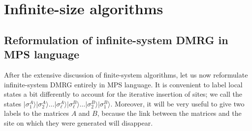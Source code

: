 \documentclass[a4paper,10pt,oneside,onecolumn,1p,times]{elsarticle}
\newcommand{\ket}[1]{\mbox{$| #1  \rangle$}}
\begin{document}
\section{Infinite-size algorithms}
\label{sec:infinite}

\subsection{Reformulation of infinite-system DMRG in MPS language}

After the extensive discussion of finite-system algorithms, let us now reformulate infinite-system DMRG entirely in MPS language. It is convenient to label local states a bit differently to account for the iterative insertion of sites; we call the states $\ket{\sigma_1^A} \ket{\sigma_2^A} \ldots \ket{\sigma_\ell^A}\ket{\sigma_\ell^B} \ldots \ket{\sigma_2^B}\ket{\sigma_1^B}$. Moreover, it will be very useful to give two labels to the matrices $A$ and $B$, 
because the link between the matrices and the site on which they were generated will disappear.
\end{document}
